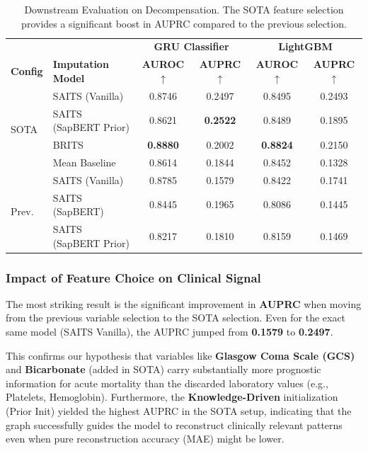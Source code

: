 \begin{table}[h]
\centering
\begin{tabular}{llcc|cc}
\toprule
 & & \multicolumn{2}{c}{\textbf{GRU Classifier}} & \multicolumn{2}{c}{\textbf{LightGBM}} \\
\textbf{Config} & \textbf{Imputation Model} & \textbf{AUROC} $\uparrow$ & \textbf{AUPRC} $\uparrow$ & \textbf{AUROC} $\uparrow$ & \textbf{AUPRC} $\uparrow$ \\
\midrule
\multirow{4}{*}{SOTA} & SAITS (Vanilla) & 0.8746 & 0.2497 & 0.8495 & 0.2493 \\
 & SAITS (SapBERT Prior) & 0.8621 & \textbf{0.2522} & 0.8489 & 0.1895 \\
 & BRITS & \textbf{0.8880} & 0.2002 & \textbf{0.8824} & 0.2150 \\
 & Mean Baseline & 0.8614 & 0.1844 & 0.8452 & 0.1328 \\
\midrule
\multirow{3}{*}{Prev.} & SAITS (Vanilla) & 0.8785 & 0.1579 & 0.8422 & 0.1741 \\
 & SAITS (SapBERT) & 0.8445 & 0.1965 & 0.8086 & 0.1445 \\
 & SAITS (SapBERT Prior) & 0.8217 & 0.1810 & 0.8159 & 0.1469 \\
\bottomrule
\end{tabular}
\caption{Downstream Evaluation on Decompensation. The SOTA feature selection provides a significant boost in AUPRC compared to the previous selection.}
\label{tab:downstream}
\end{table}

\subsubsection{Impact of Feature Choice on Clinical Signal}
The most striking result is the significant improvement in \textbf{AUPRC} when moving from the previous variable selection to the SOTA selection. Even for the exact same model (SAITS Vanilla), the AUPRC jumped from \textbf{0.1579} to \textbf{0.2497}. 

This confirms our hypothesis that variables like \textbf{Glasgow Coma Scale (GCS)} and \textbf{Bicarbonate} (added in SOTA) carry substantially more prognostic information for acute mortality than the discarded laboratory values (e.g., Platelets, Hemoglobin). Furthermore, the \textbf{Knowledge-Driven} initialization (Prior Init) yielded the highest AUPRC in the SOTA setup, indicating that the graph successfully guides the model to reconstruct clinically relevant patterns even when pure reconstruction accuracy (MAE) might be lower.




